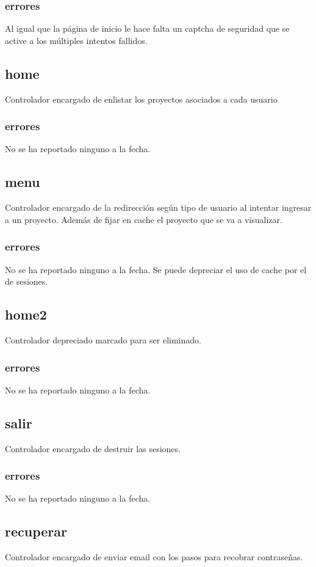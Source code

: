 \documentclass[10pt,a4paper]{book}
\begin{document}
	\subsubsection{errores}
	Al igual que la página de inicio le hace falta un captcha de seguridad que se active a los múltiples intentos fallidos.
	
	\subsection{home}
	Controlador encargado de enlistar los proyectos asociados a cada usuario
	\subsubsection{errores}
	No se ha reportado ninguno a la fecha.

	\subsection{menu}
	Controlador encargado de la redirección según tipo de usuario al intentar ingresar a un proyecto. Además de fijar en cache el proyecto que se va a visualizar.
	\subsubsection{errores}
	No se ha reportado ninguno a la fecha. Se puede depreciar el uso de cache por el de sesiones.

	\subsection{home2}
	Controlador depreciado marcado para ser eliminado.
	\subsubsection{errores}
	No se ha reportado ninguno a la fecha.

	\subsection{salir}
	Controlador encargado de destruir las sesiones.
	\subsubsection{errores}
	No se ha reportado ninguno a la fecha.

	\subsection{recuperar}\label{recuperar}
	Controlador encargado de enviar email con los pasos para recobrar contraseñas.
\end{document}
